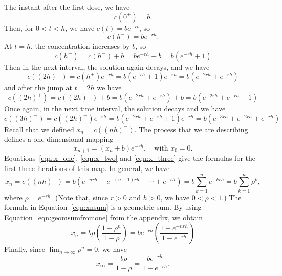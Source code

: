 \documentclass[reqno]{immbook}
\newcommand{\ds}{\displaystyle}
\numberwithin{equation}{chapter}
\numberwithin{question}{section}
\numberwithin{theorem}{chapter}
\numberwithin{figure}{chapter}
\theoremstyle{definition}
\begin{document}
The instant after the first dose, we have
\begin{equation}
  c(0^{+}) = b.
\end{equation}
Then, for $0 < t < h$, we have $c(t) = be^{-rt}$, so
\begin{equation}
  c(h^{-}) = be^{-rh}.
\label{eqn:x_one}
\end{equation}
At $t=h$, the concentration increases by $b$, so
\begin{equation}
  c(h^{+}) = c(h^{-})+b = be^{-rh} + b = b\left(e^{-rh}+1\right)
\end{equation}
Then in the next interval, the solution again decays, and we have
\begin{equation}
  c((2h)^{-}) = c(h^{+})e^{-rh} = b\left(e^{-rh}+1\right) e^{-rh}
     = b\left(e^{-2rh} + e^{-rh}\right)
\label{eqn:x_two}
\end{equation}
and after the jump at $t=2h$ we have
\begin{equation}
  c((2h)^{+}) = c((2h)^{-})+b = b\left(e^{-2rh}+e^{-rh}\right) + b
     = b\left( e^{-2rh} + e^{-rh}+1\right)
\end{equation}
Once again, in the next time interval, the solution decays and we have
\begin{equation}
  c((3h)^{-}) = c((2h)^{+})e^{-rh} = b\left( e^{-2rh} + e^{-rh}+1\right)e^{-rh}
    = b\left( e^{-3rh} + e^{-2rh}+e^{-rh}\right)
\label{eqn:x_three}
\end{equation}
Recall that we defined $x_n = c((nh)^{-})$.
The process that we are describing defines a one dimensional mapping
\begin{equation}
   x_{n+1} = (x_n+b)e^{-rh}, \quad \textrm{with $x_0=0$.}
\end{equation}
Equations~\eqref{eqn:x_one}, \eqref{eqn:x_two} and
\eqref{eqn:x_three} give the formulas for the first three
iterations of this map.
In general, we have
\begin{equation}
  x_n = c((nh)^{-}) = b\left( e^{-nrh} + e^{-(n-1)rh} + \cdots + e^{-rh}\right)
        = b \sum_{k=1}^{n} e^{-krh}
	= b \sum_{k=1}^{n} \rho^k,
\label{eqn:xnsum}
\end{equation}
where $\rho = e^{-rh}$.
(Note that, since $r>0$ and $h>0$, we have $0 < \rho < 1$.)
The formula in Equation~\eqref{eqn:xnsum} is a geometric sum.
By using Equation~\eqref{eqn:geomsumfromone} from the
appendix, we obtain
\begin{equation}
  x_n = b \rho\left(\frac{1-\rho^n}{1-\rho}\right)
      = be^{-rh}\left(\frac{1-e^{-nrh}}{1-e^{-rh}}\right)
\end{equation}
Finally, since $\ds \lim_{n\rightarrow\infty} \rho^n = 0$, we have
\begin{equation}
  x_{\infty} = \frac{b\rho}{1-\rho}
     = \frac{be^{-rh}}{1-e^{-rh}}. 
\end{equation}
\end{document}
